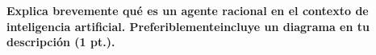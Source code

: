 \textbf{Explica brevemente qué es un agente racional en el contexto de inteligencia artificial. Preferiblementeincluye un diagrama en tu descripción (1 pt.).}